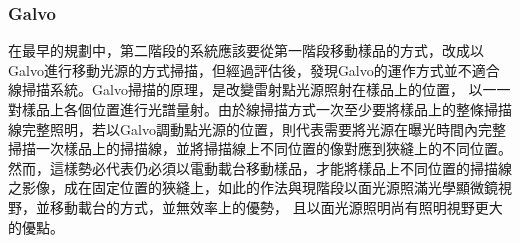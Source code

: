 \documentclass[12pt]{article}
\begin{document}
\subsubsection{Galvo}
在最早的規劃中，第二階段的系統應該要從第一階段移動樣品的方式，改成以Galvo進行移動光源的方式掃描，但經過評估後，發現Galvo的運作方式並不適合線掃描系統。Galvo掃描的原理，是改變雷射點光源照射在樣品上的位置，
以一一對樣品上各個位置進行光譜量射。由於線掃描方式一次至少要將樣品上的整條掃描線完整照明，若以Galvo調動點光源的位置，則代表需要將光源在曝光時間內完整掃描一次樣品上的掃描線，並將掃描線上不同位置的像對應到狹縫上的不同位置。
然而，這樣勢必代表仍必須以電動載台移動樣品，才能將樣品上不同位置的掃描線之影像，成在固定位置的狹縫上，如此的作法與現階段以面光源照滿光學顯微鏡視野，並移動載台的方式，並無效率上的優勢，
且以面光源照明尚有照明視野更大的優點。
\end{document}
